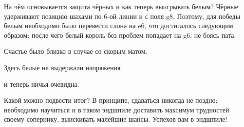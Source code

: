 \begin{multicols}{2}[]

На чём основывается защита чёрных и как теперь выигрывать белым? Чёрные удерживают позицию шахами по 6-ой линии и с поля g8. Поэтому, для победы белым необходимо было перевести слона на e6, что достигалось следующим образом:  после чего белый король без проблем попадает на g6, не боясь пата.


Счастье было близко в случае  со скорым матом.


Здесь белые не выдержали напряжения


и теперь ничья очевидна.
\end{multicols}

Какой можно подвести итог? В принципе, сдаваться никогда не поздно: необходимо научиться и в таком эндшпиле доставить максимум трудностей своему сопернику, выискивать малейшие шансы. Успехов вам в эндшпиле!